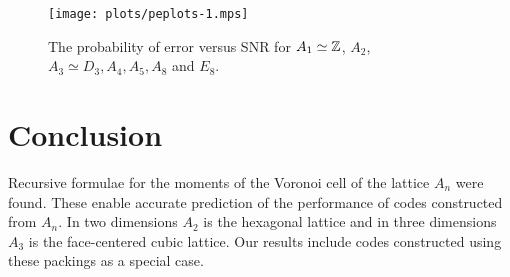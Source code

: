 \documentclass[journal, onecolumn, 11pt]{IEEEtran}
\begin{document}


\begin{figure*}[tp]
	\centering
		\texttt{[image: plots/peplots-1.mps]}
		\caption{The probability of error versus SNR for $A_1 \simeq {\mathbb Z}$, $A_2$, $A_3\simeq D_3, A_4, A_5, A_8$ and $E_8$.}
		\label{fig:peplots}
\end{figure*}


\section{Conclusion}

Recursive formulae for the moments of the Voronoi cell of the lattice $A_n$ were found.  These enable accurate prediction of the performance of codes constructed from $A_n$.  In two dimensions $A_2$ is the hexagonal lattice and in three dimensions $A_3$ is the face-centered cubic lattice.  Our results include codes constructed using these packings as a special case.  %
\end{document}
